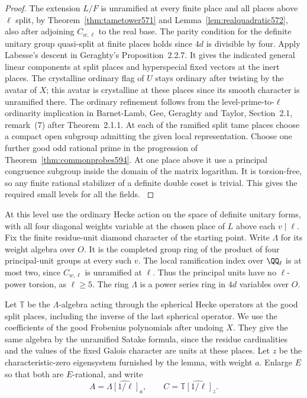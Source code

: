 \documentclass[a4paper,11pt]{article}
\theoremstyle{definition}
\theoremstyle{remark}
\numberwithin{equation}{section}
\begin{document}
\begin{proof}
The extension \(L/F\) is unramified at every finite place
and all places above \(\ell\) split, by
Theorem~\ref{thm:tametower571} and
Lemma~\ref{lem:realquadratic572}, also after adjoining
\(C_{w,\ell}\) to the real base. The parity condition for
the definite unitary group quasi-split at finite places
holds since \(4d\) is divisible by four. Apply Labesse's
descent in Geraghty's Proposition~2.2.7. It gives the
indicated general linear components at split places and
hyperspecial fixed vectors at the inert places.
The crystalline ordinary flag of \(U\) stays ordinary
after twisting by the avatar of \(X\); this avatar is
crystalline at these places since its smooth character is
unramified there. The ordinary refinement follows from
the level-prime-to-\(\ell\) ordinarity implication in
Barnet-Lamb, Gee, Geraghty and Taylor, Section~2.1,
remark~(7) after Theorem~2.1.1.
At each of the ramified split tame places choose a compact
open subgroup admitting the given local representation.
Choose one further good odd rational prime in the progression
of Theorem~\ref{thm:commonprobes594}. At one place above it
use a principal congruence subgroup inside the domain of the
matrix logarithm. It is torsion-free, so any finite rational
stabilizer of a definite double coset is trivial. This gives
the required small levels for all the fields. \cite{XII-IX-geraghty363,XII-IX-blggt560}
\end{proof}

At this level use the ordinary Hecke action on the space of
definite unitary forms, with all four diagonal weights
variable at the chosen place of \(L\) above each \(v\mid\ell\).
Fix the finite residue-unit diamond character of the starting
point. Write \(\Lambda\) for its weight algebra over \(O\).
It is the completed group ring of the product of four
principal-unit groups at every such \(v\). The local
ramification index over \(\QQ_\ell\) is at most two, since
\(C_{w,\ell}\) is unramified at \(\ell\). Thus the principal
units have no \(\ell\)-power torsion, as \(\ell\ge5\).
The ring \(\Lambda\) is a power series ring in \(4d\)
variables over \(O\).

Let \(\mathbb T\) be the \(\Lambda\)-algebra acting through
the spherical Hecke operators at the good split places,
including the inverse of the last spherical operator.
We use the coefficients of the good Frobenius polynomials
after undoing \(X\). They give the same algebra by the
unramified Satake formula, since the residue cardinalities
and the values of the fixed Galois character are units at
these places. Let \(z\) be the characteristic-zero
eigensystem furnished by the lemma, with weight \(a\).
Enlarge \(E\) so that both are \(E\)-rational, and write
\[
  A=\widehat{\Lambda[1/\ell]_a},\qquad
  C=\widehat{\mathbb T[1/\ell]_z}.
\]
\end{document}
